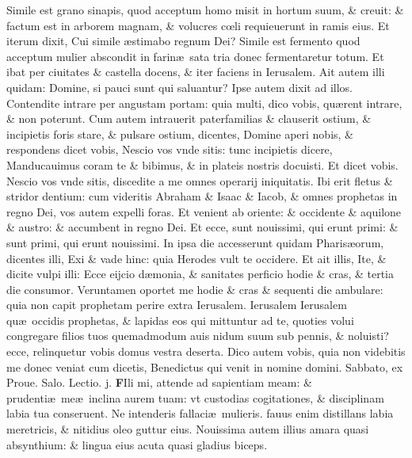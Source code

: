 \documentclass[a5paper,10pt]{book}
\def\leftmarginnote{%
	\lrmarginnote{\hskip -\marginparsep \hskip -6.5em}}
\def\ae{æ}
\def\oe{œ}
\begin{document}
\begin{multicols*}{2}
Simile est grano sinapis, quod acceptum homo misit in hortum suum, \& creuit: \& factum est in arborem magnam, \& volucres c\oe li requieuerunt in ramis eius.
Et iterum dixit, Cui simile \ae stimabo regnum Dei?
Simile est fermento quod acceptum mulier abscondit in farin\ae \ sata tria donec fermentaretur totum.
Et ibat per ciuitates \& castella docens, \& iter faciens in Ierusalem.
Ait autem illi quidam: Domine, si pauci sunt qui saluantur?
Ipse autem dixit ad illos. Contendite intrare per angustam portam: quia multi, dico vobis, qu\ae rent intrare, \& non poterunt.
Cum autem intrauerit paterfamilias \& clauserit ostium, \& incipietis foris stare, \& pulsare ostium, dicentes, Domine aperi nobis, \& respondens dicet vobis, Nescio vos vnde sitis: tunc incipietis dicere, Manducauimus coram te \& bibimus, \& in plateis nostris docuisti.
Et dicet vobis. Nescio vos vnde sitis, discedite a me omnes operarij iniquitatis.
Ibi erit fletus \& stridor dentium: cum videritis Abraham \& Isaac \& Iacob, \& omnes prophetas in regno Dei, vos autem expelli foras.
Et venient ab oriente: \& occidente \& aquilone \& austro: \& accumbent in regno Dei.
Et ecce, sunt nouissimi, qui erunt primi: \& sunt primi, qui erunt nouissimi.
In ipsa die accesserunt quidam Pharis\ae orum, dicentes illi, Exi \& vade hinc: quia Herodes vult te occidere.
Et ait illis, Ite, \& dicite vulpi illi: Ecce eijcio d\ae monia, \& sanitates perficio hodie \& cras, \& tertia die consumor.
Veruntamen oportet me hodie \& cras
\& sequenti die ambulare: quia non capit prophetam perire extra Ierusalem.
Ierusalem Ierusalem qu\ae \ occidis prophetas, \& lapidas eos qui mittuntur ad te, quoties volui congregare filios tuos quemadmodum auis nidum suum sub pennis, \& noluisti?
ecce, relinquetur vobis domus vestra deserta. Dico autem vobis, quia non videbitis me donec veniat cum dicetis, Benedictus qui venit in nomine domini.
\newline {} \color{red} \hypertarget{SAT-PRIMA-POST-ADV}{Sabbato,} ex Proue. Salo. \hfill Lectio. j. \color{black}
\vspace{-2.25em}
\lettrine[lines=2]{\bfseries F}{}Ili\leftmarginnote{\begin{flushright}ca. 5.\end{flushright}} mi, attende ad sapientiam meam: \& prudenti\ae \ me\ae \ inclina aurem tuam: vt custodias cogitationes, \& disciplinam labia tua conseruent.
Ne intenderis fallaci\ae \ mulieris. fauus enim distillans labia meretricis, \& nitidius oleo guttur eius.
Nouissima autem illius amara quasi absynthium: \& lingua eius acuta quasi gladius biceps.

\end{multicols*}
\end{document}
